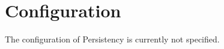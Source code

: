 \chapter{Configuration}
\label{chap:Configuration}
The configuration of Persistency is currently not specified.
